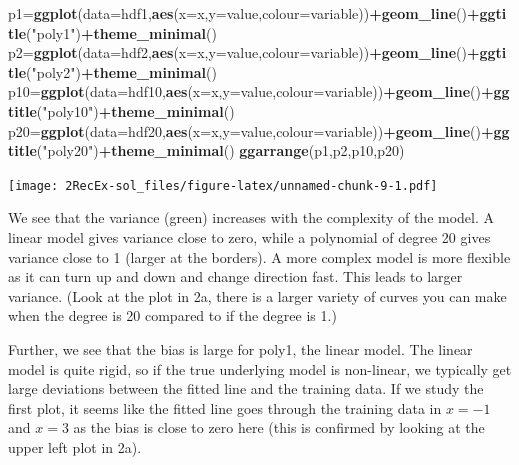 \documentclass[]{article}
\newenvironment{Shaded}{\begin{snugshade}}{\end{snugshade}}
\newcommand{\KeywordTok}[1]{\textcolor[rgb]{0.13,0.29,0.53}{\textbf{#1}}}
\newcommand{\DataTypeTok}[1]{\textcolor[rgb]{0.13,0.29,0.53}{#1}}
\newcommand{\StringTok}[1]{\textcolor[rgb]{0.31,0.60,0.02}{#1}}
\newcommand{\OperatorTok}[1]{\textcolor[rgb]{0.81,0.36,0.00}{\textbf{#1}}}
\newcommand{\NormalTok}[1]{#1}
\begin{document}
\begin{Shaded}
\begin{Highlighting}[]
\NormalTok{p1=}\KeywordTok{ggplot}\NormalTok{(}\DataTypeTok{data=}\NormalTok{hdf1,}\KeywordTok{aes}\NormalTok{(}\DataTypeTok{x=}\NormalTok{x,}\DataTypeTok{y=}\NormalTok{value,}\DataTypeTok{colour=}\NormalTok{variable))}\OperatorTok{+}\KeywordTok{geom_line}\NormalTok{()}\OperatorTok{+}\KeywordTok{ggtitle}\NormalTok{(}\StringTok{"poly1"}\NormalTok{)}\OperatorTok{+}\KeywordTok{theme_minimal}\NormalTok{()}
\NormalTok{p2=}\KeywordTok{ggplot}\NormalTok{(}\DataTypeTok{data=}\NormalTok{hdf2,}\KeywordTok{aes}\NormalTok{(}\DataTypeTok{x=}\NormalTok{x,}\DataTypeTok{y=}\NormalTok{value,}\DataTypeTok{colour=}\NormalTok{variable))}\OperatorTok{+}\KeywordTok{geom_line}\NormalTok{()}\OperatorTok{+}\KeywordTok{ggtitle}\NormalTok{(}\StringTok{"poly2"}\NormalTok{)}\OperatorTok{+}\KeywordTok{theme_minimal}\NormalTok{()}
\NormalTok{p10=}\KeywordTok{ggplot}\NormalTok{(}\DataTypeTok{data=}\NormalTok{hdf10,}\KeywordTok{aes}\NormalTok{(}\DataTypeTok{x=}\NormalTok{x,}\DataTypeTok{y=}\NormalTok{value,}\DataTypeTok{colour=}\NormalTok{variable))}\OperatorTok{+}\KeywordTok{geom_line}\NormalTok{()}\OperatorTok{+}\KeywordTok{ggtitle}\NormalTok{(}\StringTok{"poly10"}\NormalTok{)}\OperatorTok{+}\KeywordTok{theme_minimal}\NormalTok{()}
\NormalTok{p20=}\KeywordTok{ggplot}\NormalTok{(}\DataTypeTok{data=}\NormalTok{hdf20,}\KeywordTok{aes}\NormalTok{(}\DataTypeTok{x=}\NormalTok{x,}\DataTypeTok{y=}\NormalTok{value,}\DataTypeTok{colour=}\NormalTok{variable))}\OperatorTok{+}\KeywordTok{geom_line}\NormalTok{()}\OperatorTok{+}\KeywordTok{ggtitle}\NormalTok{(}\StringTok{"poly20"}\NormalTok{)}\OperatorTok{+}\KeywordTok{theme_minimal}\NormalTok{()}
\KeywordTok{ggarrange}\NormalTok{(p1,p2,p10,p20)}
\end{Highlighting}
\end{Shaded}

\texttt{[image: 2RecEx-sol\_files/figure-latex/unnamed-chunk-9-1.pdf]}

We see that the variance (green) increases with the complexity of the
model. A linear model gives variance close to zero, while a polynomial
of degree 20 gives variance close to 1 (larger at the borders). A more
complex model is more flexible as it can turn up and down and change
direction fast. This leads to larger variance. (Look at the plot in 2a,
there is a larger variety of curves you can make when the degree is 20
compared to if the degree is 1.)

Further, we see that the bias is large for poly1, the linear model. The
linear model is quite rigid, so if the true underlying model is
non-linear, we typically get large deviations between the fitted line
and the training data. If we study the first plot, it seems like the
fitted line goes through the training data in \(x=-1\) and \(x=3\) as
the bias is close to zero here (this is confirmed by looking at the
upper left plot in 2a).
\end{document}
